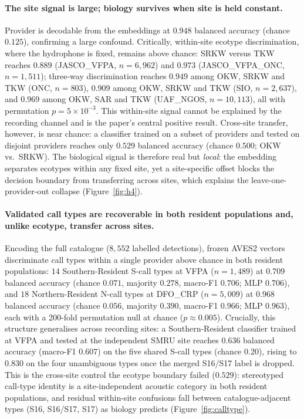 \documentclass[11pt]{article}
\begin{document}
\paragraph{The site signal is large; biology survives when site is held constant.} Provider
is decodable from the embeddings at $0.948$ balanced accuracy (chance $0.125$), confirming a
large confound. Critically, within-site ecotype discrimination, where the hydrophone is
fixed, remains above chance: SRKW versus TKW reaches $0.889$ (JASCO\_VFPA, $n=6{,}962$) and
$0.973$ (JASCO\_VFPA\_ONC, $n=1{,}511$); three-way discrimination reaches
$0.949$ among OKW, SRKW and TKW (ONC, $n=803$), $0.909$ among OKW, SRKW and TKW
(SIO, $n=2{,}637$), and $0.969$ among OKW, SAR and TKW (UAF\_NGOS, $n=10{,}113$), all with permutation
$p=5\times10^{-3}$. This within-site signal cannot be explained by the recording channel and
is the paper's central positive result. Cross-site transfer, however, is near chance: a
classifier trained on a subset of providers and tested on disjoint providers reaches only
$0.529$ balanced accuracy (chance $0.500$; OKW vs.\ SRKW). The biological signal is therefore
real but \emph{local}: the embedding separates ecotypes within any fixed site, yet a
site-specific offset blocks the decision boundary from transferring across sites, which
explains the leave-one-provider-out collapse (Figure~\ref{fig:h4}).

\paragraph{Validated call types are recoverable in both resident populations and, unlike
ecotype, transfer across sites.} Encoding the full catalogue ($8{,}552$ labelled detections),
frozen AVES2 vectors discriminate call types within a single provider above chance in both
resident populations: $14$ Southern-Resident S-call types at VFPA ($n=1{,}489$) at $0.709$
balanced accuracy (chance $0.071$, majority $0.278$, macro-F1 $0.706$; MLP $0.706$), and $18$
Northern-Resident N-call types at DFO\_CRP ($n=5{,}009$) at $0.968$ balanced accuracy (chance
$0.056$, majority $0.390$, macro-F1 $0.966$; MLP $0.963$), each with a 200-fold permutation null
at chance ($p\approx0.005$). Crucially, this structure generalises across recording sites: a
Southern-Resident classifier trained at VFPA and tested at the independent SMRU site reaches
$0.636$ balanced accuracy (macro-F1 $0.607$) on the five shared S-call types (chance $0.20$),
rising to $0.830$ on the four unambiguous types once the merged S16/S17 label is dropped. This
is the cross-site control the ecotype boundary failed ($0.529$): stereotyped call-type identity
is a site-independent acoustic category in both resident populations, and residual within-site
confusions fall between catalogue-adjacent types (S16, S16/S17, S17) as biology predicts
(Figure~\ref{fig:calltype}).
\end{document}
